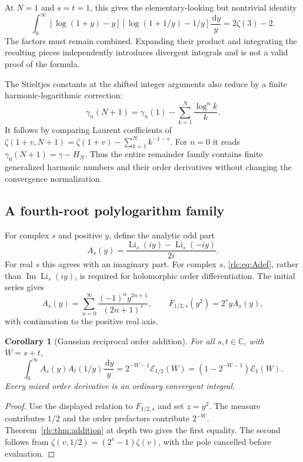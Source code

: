 \documentclass[11pt,a4paper]{article}
\numberwithin{equation}{section}
\newtheorem{corollary}[theorem]{Corollary}
\theoremstyle{definition}\newtheorem{definition}[theorem]{Definition}
\theoremstyle{remark}\newtheorem{remark}[theorem]{Remark}
\DeclareMathOperator{\Li}{Li}
\DeclareMathOperator{\Ima}{Im}
\newcommand{\dd}{\,\mathrm d}
\newcommand{\C}{\mathbb C}\newcommand{\R}{\mathbb R}\newcommand{\N}{\mathbb N}
\newcommand{\E}{\mathcal E}
\begin{document}
At $N=1$ and $s=t=1$, this gives the elementary-looking but nontrivial
identity
\begin{equation}\label{rlc:eq:remainderexample}
 \int_0^\infty
 [\log(1+y)-y][\log(1+1/y)-1/y]\frac{\dd y}{y}
       =2\zeta(3)-2.
\end{equation}
The factors must remain combined. Expanding their product and
integrating the resulting pieces independently introduces divergent
integrals and is not a valid proof of the formula.

The Stieltjes constants at the shifted integer arguments also reduce
by a finite harmonic-logarithmic correction:
\begin{equation}\label{rlc:eq:stieltjesshift}
 \gamma_n(N+1)=\gamma_n(1)
           -\sum_{k=1}^N\frac{\log^n k}{k}.
\end{equation}
It follows by comparing Laurent coefficients of
$\zeta(1+v,N+1)=\zeta(1+v)-\sum_{k=1}^N k^{-1-v}$.
For $n=0$ it reads $\gamma_0(N+1)=\gamma-H_N$.
Thus the entire remainder family contains finite generalized harmonic
numbers and their order derivatives without changing the convergence
normalization.

\subsection{A fourth-root polylogarithm family}
For complex $s$ and positive $y$, define the analytic odd part
\begin{equation}\label{rlc:eq:Adef}
 A_s(y)=\frac{\Li_s(iy)-\Li_s(-iy)}{2i}.
\end{equation}
For real $s$ this agrees with an imaginary part. For complex $s$,
\eqref{rlc:eq:Adef}, rather than $\Ima\Li_s(iy)$, is required for
holomorphic order differentiation.
The initial series gives
\[
 A_s(y)=\sum_{n=0}^\infty\frac{(-1)^ny^{2n+1}}{(2n+1)^s},\qquad
 F_{1/2,s}(y^2)=2^s y A_s(y),
\]
with continuation to the positive real axis.

\begin{corollary}[Gaussian reciprocal order addition]
\label{rlc:cor:gaussian}
For all $s,t\in\C$, with $W=s+t$,
\begin{equation}\label{rlc:eq:gaussian}
 \boxed{\displaystyle
 \int_0^\infty A_s(y)A_t(1/y)\frac{\dd y}{y}
 =2^{-W-1}\E_{1/2}(W)
       =(1-2^{-W-1})\E_1(W).}
\end{equation}
Every mixed order derivative is an ordinary convergent integral.
\end{corollary}
\begin{proof}
Use the displayed relation to $F_{1/2,s}$ and set $z=y^2$.
The measure contributes $1/2$ and the order prefactors contribute
$2^{-W}$. Theorem~\ref{rlc:thm:addition} at depth two gives the first
equality. The second follows from
$\zeta(v,1/2)=(2^v-1)\zeta(v)$, with the pole cancelled before evaluation.
\end{proof}
\end{document}
